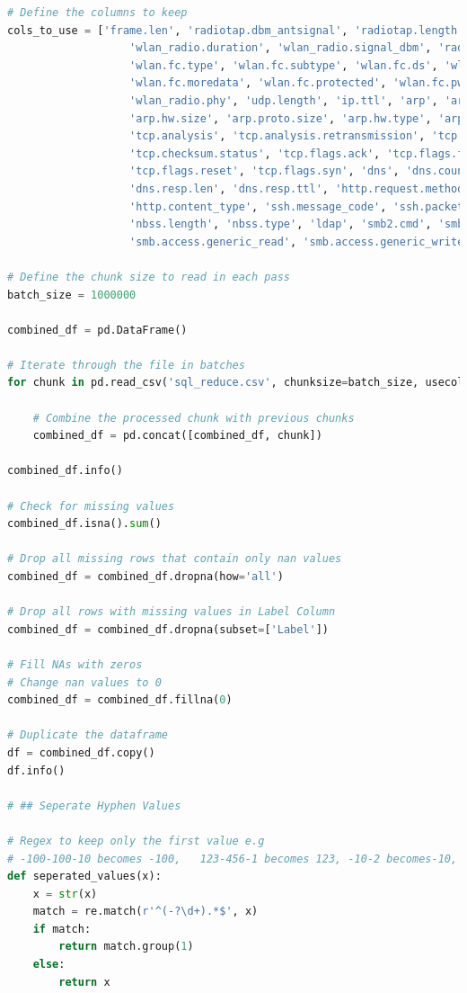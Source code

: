 \begin{appendices}
\begin{lstlisting}[language=Python]
# Define the columns to keep
cols_to_use = ['frame.len', 'radiotap.dbm_antsignal', 'radiotap.length', 'wlan.duration',
                   'wlan_radio.duration', 'wlan_radio.signal_dbm', 'radiotap.present.tsft',
                   'wlan.fc.type', 'wlan.fc.subtype', 'wlan.fc.ds', 'wlan.fc.frag',
                   'wlan.fc.moredata', 'wlan.fc.protected', 'wlan.fc.pwrmgt', 'wlan.fc.retry',
                   'wlan_radio.phy', 'udp.length', 'ip.ttl', 'arp', 'arp.proto.type',
                   'arp.hw.size', 'arp.proto.size', 'arp.hw.type', 'arp.opcode',
                   'tcp.analysis', 'tcp.analysis.retransmission', 'tcp.option_len',
                   'tcp.checksum.status', 'tcp.flags.ack', 'tcp.flags.fin', 'tcp.flags.push',
                   'tcp.flags.reset', 'tcp.flags.syn', 'dns', 'dns.count.queries', 'dns.count.answers',
                   'dns.resp.len', 'dns.resp.ttl', 'http.request.method', 'http.response.code',
                   'http.content_type', 'ssh.message_code', 'ssh.packet_length', 'nbns',
                   'nbss.length', 'nbss.type', 'ldap', 'smb2.cmd', 'smb.flags.response',
                   'smb.access.generic_read', 'smb.access.generic_write', 'smb.access.generic_execute','Label']

# Define the chunk size to read in each pass
batch_size = 1000000

combined_df = pd.DataFrame()

# Iterate through the file in batches
for chunk in pd.read_csv('sql_reduce.csv', chunksize=batch_size, usecols=cols_to_use, low_memory=False):
    
    # Combine the processed chunk with previous chunks
    combined_df = pd.concat([combined_df, chunk])

combined_df.info()

# Check for missing values
combined_df.isna().sum()

# Drop all missing rows that contain only nan values
combined_df = combined_df.dropna(how='all')

# Drop all rows with missing values in Label Column
combined_df = combined_df.dropna(subset=['Label'])

# Fill NAs with zeros
# Change nan values to 0
combined_df = combined_df.fillna(0)

# Duplicate the dataframe
df = combined_df.copy()
df.info()

# ## Seperate Hyphen Values

# Regex to keep only the first value e.g 
# -100-100-10 becomes -100,   123-456-1 becomes 123, -10-2 becomes-10, 81-63-63 becomes 81
def seperated_values(x):
    x = str(x)
    match = re.match(r'^(-?\d+).*$', x)
    if match:
        return match.group(1)
    else:
        return x


\end{lstlisting}
\end{appendices}
